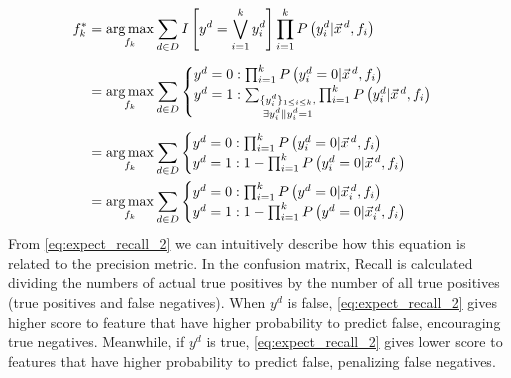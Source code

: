 \begin{align}
f_k^*&=\argmax_{f_k}\sum_{d\in D}I\left[y^d=\bigvee_{i=1}^k y^d_i\right]\prod_{i=1}^kP\left(y_i^d|\vec{x}^{\,d},f_i\right)\nonumber\\[0.5em]
&=\argmax_{f_k}\sum_{d\in D}
\begin{cases}
	y^d=0: \prod_{i=1}^kP\left(y_i^d=0|\vec{x}^{\,d},f_i\right)\\
	y^d=1: \sum_{\substack{\{y_i^d\}_{1\leq i\leq k},\\ \exists{y_i^d\|y_i^d=1}}}\prod_{i=1}^kP\left(y_i^d|\vec{x}^{\,d},f_i\right)
\end{cases}\nonumber\\[0.5em]
&=\argmax_{f_k}\sum_{d\in D}
\begin{cases}
	y^d=0: \prod_{i=1}^kP\left(y_i^d=0|\vec{x}^{\,d},f_i\right)\\
	y^d=1: 1-\prod_{i=1}^kP\left(y_i^d=0|\vec{x}^{\,d},f_i\right)
\end{cases}\label{eq:expect_recall_2}\\
&=\argmax_{f_k}\sum_{d\in D}
\begin{cases}
	y^d=0: \prod_{i=1}^kP\left(y^d=0|\vec{x}_i^{\,d},f_i\right)\\
	y^d=1: 1-\prod_{i=1}^kP\left(y^d=0|\vec{x}_i^{\,d},f_i\right)
\end{cases}\nonumber
\end{align}
From \eqref{eq:expect_recall_2} we can intuitively describe how this
equation is related to the precision metric. In the confusion matrix,
Recall is calculated dividing the numbers of actual true positives by
the number of all true positives (true positives and false
negatives). When $y^d$ is false, \eqref{eq:expect_recall_2} gives
higher score to feature that have higher probability to predict false,
encouraging true negatives. Meanwhile, if $y^d$ is true,
\eqref{eq:expect_recall_2} gives lower score to features that have
higher probability to predict false, penalizing false negatives.

